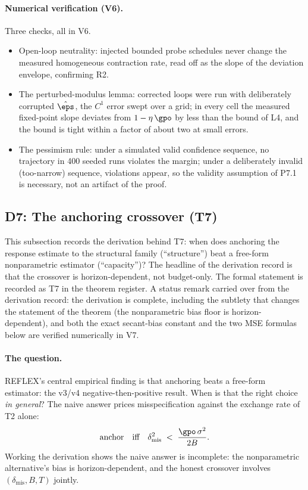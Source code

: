 \paragraph{Numerical verification (V6).}
Three checks, all in V6.
\begin{itemize}
\item Open-loop neutrality: injected bounded probe schedules never change
the measured homogeneous contraction rate, read off as the slope of the
deviation envelope, confirming R2.
\item The perturbed-modulus lemma: corrected loops were run with
deliberately corrupted $\hat\eps$, the $C^1$ error swept over a grid; in
every cell the measured fixed-point slope deviates from $1 - \eta\,\gpo$
by less than the bound of L4, and the bound is tight within a factor of
about two at small errors.
\item The pessimism rule: under a simulated valid confidence sequence, no
trajectory in 400 seeded runs violates the margin; under a deliberately
invalid (too-narrow) sequence, violations appear, so the validity
assumption of P7.1 is necessary, not an artifact of the proof.
\end{itemize}

\subsection*{D7: The anchoring crossover (T7)}

This subsection records the derivation behind T7: when does anchoring the
response estimate to the structural family (``structure'') beat a free-form
nonparametric estimator (``capacity'')? The headline of the derivation
record is that the crossover is horizon-dependent, not budget-only. The
formal statement is recorded as T7 in the theorem register. A status remark
carried over from the derivation record: the derivation is complete,
including the subtlety that changes the statement of the theorem (the
nonparametric bias floor is horizon-dependent), and both the exact
secant-bias constant and the two MSE formulas below are verified
numerically in V7.

\paragraph{The question.}
REFLEX's central empirical finding is that anchoring beats a free-form
estimator: the v3/v4 negative-then-positive result. When is that the right choice
\emph{in general}? The naive answer prices misspecification against the
exchange rate of T2 alone:
\begin{equation*}
  \text{anchor} \quad \text{iff} \quad
  \delta_{\mathrm{mis}}^2 \;<\; \frac{\gpo\,\sigma^2}{2B}.
\end{equation*}
Working the derivation shows the naive answer is incomplete: the
nonparametric alternative's bias is horizon-dependent, and the honest
crossover involves $(\delta_{\mathrm{mis}}, B, T)$ jointly.

